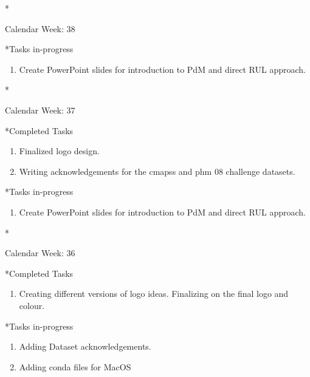 \documentclass[11pt,a4paper]{article}
\begin{document}
\newpage
\begin{section}*{Calendar Week: 38 \hfill \date{24 September, 2021}}
 \begin{refsection}
     \begin{subsection}*{Tasks in-progress}
         \begin{enumerate}
             \item Create PowerPoint slides for introduction to PdM and direct RUL approach.
         \end{enumerate}
     \end{subsection}
 \end{refsection}
\end{section}
\newpage
\begin{section}*{Calendar Week: 37 \hfill \date{17 September, 2021}}
 \begin{refsection}
     \begin{subsection}*{Completed Tasks}
         \begin{enumerate}
             \item Finalized logo design.
             \item Writing acknowledgements for the cmapss and phm 08 challenge datasets.
         \end{enumerate}
     \end{subsection}
     \begin{subsection}*{Tasks in-progress}
         \begin{enumerate}
             \item Create PowerPoint slides for introduction to PdM and direct RUL approach.
         \end{enumerate}
     \end{subsection}
 \end{refsection}
\end{section}

\newpage
\begin{section}*{Calendar Week: 36 \hfill \date{10 September, 2021}}
 \begin{refsection}
     \begin{subsection}*{Completed Tasks}
         \begin{enumerate}
             \item Creating different versions of logo ideas. Finalizing on the final logo and colour.
         \end{enumerate}
     \end{subsection}
     \begin{subsection}*{Tasks in-progress}
         \begin{enumerate}
             \item Adding Dataset acknowledgements.
             \item Adding conda files for MacOS
         \end{enumerate}
     \end{subsection}
 \end{refsection}
\end{section}
\end{document}
